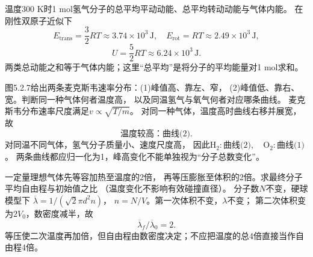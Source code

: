 \problemtext 温度300 K时1 mol氢气分子的总平均平动动能、总平均转动动能与气体内能。
\workings
在刚性双原子近似下
\[
\boxed{E_{\mathrm{trans}}=\frac32RT\approx3.74\times10^3\,\mathrm J},\quad
\boxed{E_{\mathrm{rot}}=RT\approx2.49\times10^3\,\mathrm J},
\]
\[
\boxed{U=\frac52RT\approx6.24\times10^3\,\mathrm J}.
\]
\crosscheck 两类总动能之和等于气体内能；这里“总平均”是将分子的平均能量对1 mol求和。

\problemtext 图5.2.7给出两条麦克斯韦速率分布：(1)峰值高、靠左、窄，
(2)峰值低、靠右、宽。判断同一种气体何者温度高，
以及同温氢气与氧气何者对应哪条曲线。
\workings
麦克斯韦分布速率尺度满足$v\propto\sqrt{T/m}$。
对同一种气体，温度高时曲线右移并展宽，故
\[
\boxed{\text{温度较高：曲线(2)}}.
\]
对同温不同气体，氢气分子质量小、速度尺度高，
因此$\boxed{\mathrm{H_2}:\text{曲线(2)},\quad
\mathrm{O_2}:\text{曲线(1)}}$。
\crosscheck 两条曲线都应归一化为1，峰高变化不能单独视为“分子总数变化”。

\problemtext 一定量理想气体先等容加热至温度的2倍，
再等压膨胀至体积的2倍。求最终分子平均自由程与初始值之比
（温度变化不影响有效碰撞直径）。
\workings
分子数$N$不变，硬球模型下
$\overline\lambda=1/(\sqrt2\pi d^2n)$，
$n=N/V$。第一次体积不变，$\lambda$不变；
第二次体积变为$2V_0$，数密度减半，故
\[
\boxed{\overline\lambda_f/\overline\lambda_0=2}.
\]
\crosscheck 等压使二次温度再加倍，但自由程由数密度决定；不应把温度的总4倍直接当作自由程4倍。
